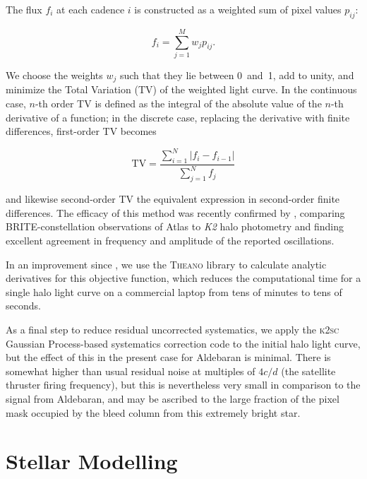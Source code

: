\documentclass[modern]{aastex61}
\newcommand{\ktwo}{\emph{K2}\xspace}
\begin{document}
The flux $f_i$ at each cadence $i$ is constructed as a weighted sum of pixel values $p_{ij}$:

\begin{equation}
	f_i = \sum_{j=1}^{M} w_j p_{ij}.
\end{equation}

\noindent We choose the weights $w_j$ such that they lie between 0~and~1, add to unity, and minimize the Total Variation (TV) of the weighted light curve. In the continuous case, $n$-th order TV is defined as the integral of the absolute value of the $n$-th derivative of a function; in the discrete case, replacing the derivative with finite differences, first-order TV becomes

\begin{equation}
\text{TV} = \dfrac{\sum_{i=1}^{N} |{f}_i - {f}_{i-1}|}{\sum_{j=1}^{N} {f}_j}
\end{equation}

\noindent and likewise second-order TV the equivalent expression in second-order finite differences. The efficacy of this method was recently confirmed by \citet{kallinger2017}, comparing BRITE-constellation observations of Atlas to \ktwo halo photometry and finding excellent agreement in frequency and amplitude of the reported oscillations.

In an improvement since \citet{White2017}, we use the \textsc{Theano} library \citep{theano} to calculate analytic derivatives for this objective function, which reduces the computational time for a single halo light curve on a commercial laptop from tens of minutes to tens of seconds.

As a final step to reduce residual uncorrected systematics, we apply the \textsc{k2sc} \citep{k2sc} Gaussian Process-based systematics correction code to the initial halo light curve, but the effect of this in the present case for Aldebaran is minimal.
There is somewhat higher than usual residual noise at multiples of $4 c/d$ (the satellite thruster firing frequency), but this is nevertheless very small in comparison to the signal from Aldebaran, and may be ascribed to the large fraction of the pixel mask occupied by the bleed column from this extremely bright star.

\section{Stellar Modelling}\label{sec:mod}
\end{document}
